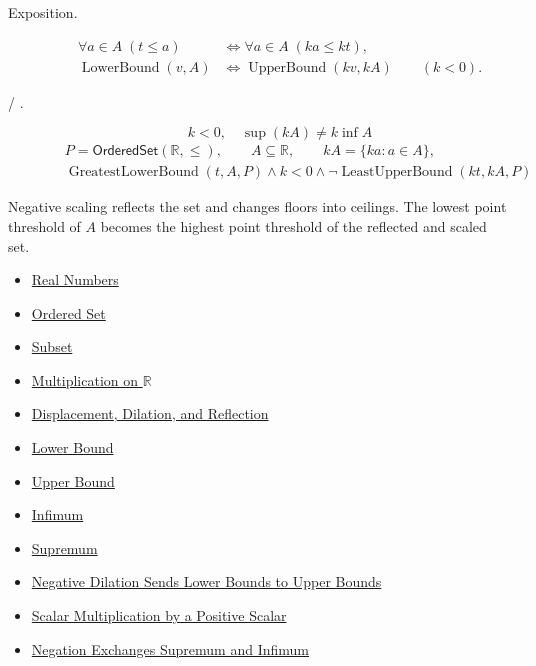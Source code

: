 \begin{remark*}
\begin{description}
  \item[Exposition.]
\[
\begin{aligned}
\forall a\in A\;(t\leq a)
&\Longleftrightarrow
\forall a\in A\;(ka\leq kt),\\
\operatorname{LowerBound}(v,A)
&\Longleftrightarrow
\operatorname{UpperBound}(kv,kA)
\qquad(k<0).
\end{aligned}
\]


  \item[ / .]
  \[
k<0,\quad \sup(kA)\ne k\inf A
\]
\[
\begin{aligned}
&P=\mathsf{OrderedSet}(\mathbb{R},\leq),\qquad A\subseteq\mathbb{R},\qquad kA=\{ka:a\in A\},\\
&\operatorname{GreatestLowerBound}(t,A,P)\land k<0\land
\neg\operatorname{LeastUpperBound}(kt,kA,P)
\end{aligned}
\]
\end{description}
\end{remark*}

\begin{remark*}[Interpretation]
Negative scaling reflects the set and changes floors into ceilings. The lowest point threshold of $A$ becomes the highest point threshold of the reflected and scaled set.
\end{remark*}

\begin{dependencies}
\begin{itemize}
  \item \hyperref[def:reals]{Real Numbers}
  \item \hyperref[def:ordered-set]{Ordered Set}
  \item \hyperref[def:subset]{Subset}
  \item \hyperref[def:multiplication-on-r]{Multiplication on $\mathbb{R}$}
  \item \hyperref[def:displacement-dilation-reflection]{Displacement, Dilation, and Reflection}
  \item \hyperref[def:real-lower-bound]{Lower Bound}
  \item \hyperref[def:real-upper-bound]{Upper Bound}
  \item \hyperref[def:infimum]{Infimum}
  \item \hyperref[def:supremum]{Supremum}
  \item \hyperref[prop:negative-dilation-sends-lower-to-upper-bounds]{Negative Dilation Sends Lower Bounds to Upper Bounds}
  \item \hyperref[thm:scalar-mult-positive]{Scalar Multiplication by a Positive Scalar}
  \item \hyperref[thm:negation-exchange-sup-inf]{Negation Exchanges Supremum and Infimum}
\end{itemize}
\end{dependencies}

